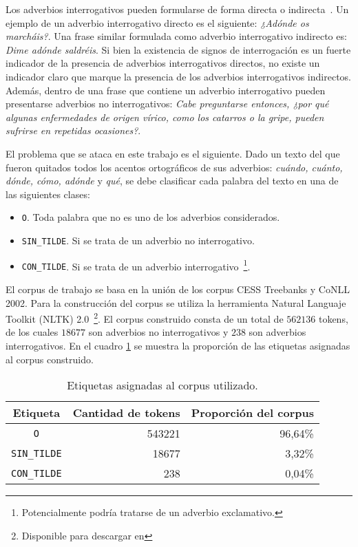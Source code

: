 \documentclass[runningheads,a4paper]{llncs}
\begin{document}
Los adverbios interrogativos pueden formularse de forma directa o indirecta~\cite{VECIANA04}. Un ejemplo de un adverbio interrogativo directo es el siguiente: \emph{¿Adónde os marcháis?}. Una frase similar formulada como adverbio interrogativo indirecto es: \emph{Dime adónde saldréis}. Si bien la existencia de signos de interrogación es un fuerte indicador de la presencia de adverbios interrogativos directos, no existe un indicador claro que marque la presencia de los adverbios interrogativos indirectos. Además, dentro de una frase que contiene un adverbio interrogativo pueden presentarse adverbios no interrogativos: \emph{Cabe preguntarse entonces, ¿por qué algunas enfermedades de origen vírico, como los catarros o la gripe, pueden sufrirse en repetidas ocasiones?}.

El problema que se ataca en este trabajo es el siguiente. Dado un texto del que fueron quitados todos los acentos ortográficos de sus adverbios: \emph{cuándo, cuánto, dónde, cómo, adónde} y \emph{qué}, se debe clasificar cada palabra del texto en una de las siguientes clases: 
\begin{itemize}
	\item {\texttt{O}}. Toda palabra que no es uno de los adverbios considerados.
	\item {\texttt{SIN\_TILDE}}. Si se trata de un adverbio no interrogativo.
	\item {\texttt{CON\_TILDE}}. Si se trata de un adverbio interrogativo~\footnote{Potencialmente podr\'ia tratarse de un adverbio exclamativo.}.
\end{itemize}

El corpus de trabajo se basa en la unión de los corpus CESS Treebanks y CoNLL 2002. Para la construcción del corpus se utiliza la herramienta Natural Languaje Toolkit (NLTK) 2.0~\footnote{Disponible para descargar en \nltk}. El corpus construido consta de un total de $562136$ tokens, de los cuales $18677$ son adverbios no interrogativos y $238$ son adverbios interrogativos. En el cuadro \ref{table:corpus} se muestra la proporci\'on de las etiquetas asignadas al corpus construido.

\begin{table}[ht]
 	\renewcommand{\arraystretch}{1.3}
	\renewcommand{\tabcolsep}{3pt}
	\caption{Etiquetas asignadas al corpus utilizado.}
	\label{table:corpus}
	\centering
	\begin{tabular}{c r r}
		\hline\hline
		\multicolumn{1}{c}{\textbf{Etiqueta}} & \multicolumn{1}{c}{\textbf{Cantidad de tokens}} & \multicolumn{1}{c}{\textbf{Proporci\'on del corpus}} \\
		\hline
		\texttt{O} & 543221 & 96,64\% \\
		\texttt{SIN\_TILDE} & 18677 & 3,32\% \\
		\texttt{CON\_TILDE} & 238 & 0,04\% \\
		\hline
	\end{tabular}
\end{table}
\end{document}
